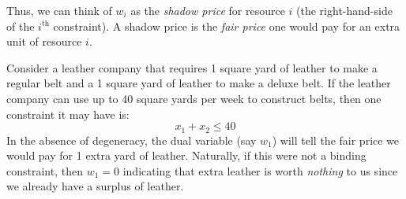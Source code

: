 Thus, we can think of $w_i$ as the \textit{shadow price} for resource $i$ (the right-hand-side of the $i^\text{th}$ constraint). A shadow price is the \textit{fair price} one would pay for an extra unit of resource $i$. 
\begin{example}
Consider a leather company that requires 1 square yard of leather to make a regular belt and a 1 square yard of leather to make a deluxe belt. If the leather company can use up to 40 square yards per week to construct belts, then one constraint it may have is:
\begin{displaymath}
x_1 + x_2 \leq 40
\end{displaymath}
In the absence of degeneracy, the dual variable (say $w_1$) will tell the fair price we would pay for 1 extra yard of leather. Naturally, if this were not a binding constraint, then $w_1 = 0$ indicating that extra leather is worth \textit{nothing} to us since we already have a surplus of leather.
\end{example} 

